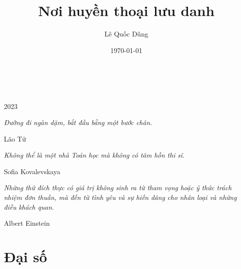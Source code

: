 \documentclass[oneside]{book}
\title{Nơi huyền thoại lưu danh}
\author{Lê Quốc Dũng}
\date{\today}
\begin{document}
\begin{titlepage}
		\\
			
		\vspace{10mm}
		\\
		\vspace{\fill}
		\centering \large{2023}
\end{titlepage}

\newpage

\vspace*{2cm}

\begin{center}
	{\Large 
			\textit{Đường đi ngàn dặm, bắt đầu bằng một bước chân.}
	}
	\Large{\parbox{10cm}{
		\begin{raggedleft}
		\vspace{.5cm}\hfill{Lão Tử}
		\end{raggedleft}
	}
}
\end{center}

\begin{center}
	{\Large 
			\textit{Không thể là một nhà Toán học mà không có tâm hồn thi sĩ.}
	}
	\Large{\parbox{10cm}{
		\begin{raggedleft}
		\vspace{.5cm}\hfill{Sofia Kovalevskaya}
		\end{raggedleft}
	}
}
\end{center}

\begin{center}
	{\Large 
			\textit{Những thứ đích thực có giá trị không sinh ra từ tham
			vọng hoặc ý thức trách nhiệm đơn thuần, mà đến từ tình yêu và
			sự hiến dâng cho nhân loại và những điều khách quan.}
	}
	\Large{\parbox{10cm}{
		\begin{raggedleft}
		\vspace{.5cm}\hfill{Albert Einstein}
		\end{raggedleft}
	}
}
\end{center}

\newpage

\tableofcontents

\newpage

\part{Đại số}


\end{document}
